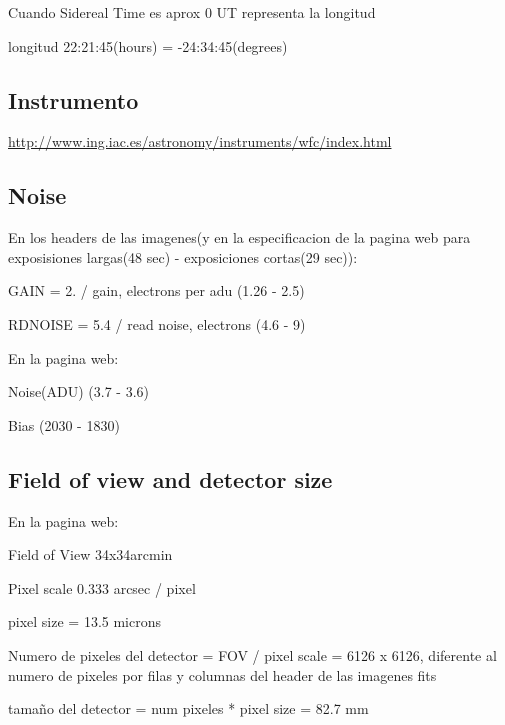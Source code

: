 \documentclass{article}
\begin{document}
\begin{description}
\item Cuando Sidereal Time es aprox 0 UT representa la longitud
\item longitud 22:21:45(hours) = -24:34:45(degrees)    

\end{description}

\subsection*{Instrumento}
\url{http://www.ing.iac.es/astronomy/instruments/wfc/index.html}

\subsection*{Noise}
En los headers de las imagenes(y en la especificacion de la pagina web para exposisiones largas(48 sec) - exposiciones cortas(29 sec)):
\begin{description}
\item GAIN    =                   2.  /  gain, electrons per adu (1.26 - 2.5)
\item RDNOISE =                  5.4  /  read noise, electrons (4.6 - 9)
\end{description}

En la pagina web:
\begin{description}
\item Noise(ADU) (3.7 - 3.6)
\item Bias (2030 - 1830)
\end{description}

\subsection*{Field of view and detector size}
En la pagina web:
\begin{description}
\item Field of View 34x34arcmin
\item Pixel scale 0.333 arcsec / pixel
\item pixel size = 13.5 microns
\end{description}


\begin{description}
\item Numero de pixeles del detector = FOV / pixel scale = 6126 x 6126, diferente al numero de pixeles por filas y columnas del header de las imagenes fits 
\item tamaño del detector = num pixeles * pixel size = 82.7 mm
\end{description}
\end{document}
